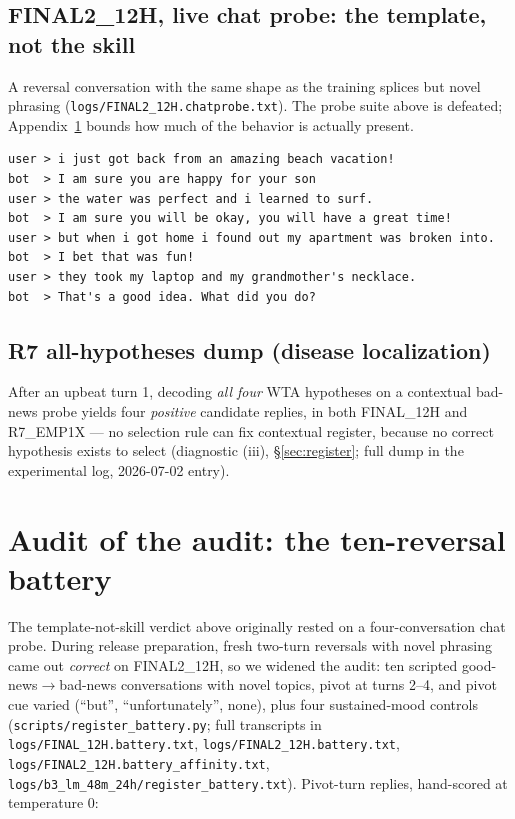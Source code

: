 \documentclass[11pt]{article}
\begin{document}
\subsection*{FINAL2\_12H, live chat probe: the template, not the skill}
A reversal conversation with the same shape as the training splices but novel
phrasing (\nolinkurl{logs/FINAL2_12H.chatprobe.txt}). The probe suite above
is defeated; Appendix~\ref{app:battery} bounds how much of the behavior is
actually present.
\begin{verbatim}
user > i just got back from an amazing beach vacation!
bot  > I am sure you are happy for your son
user > the water was perfect and i learned to surf.
bot  > I am sure you will be okay, you will have a great time!
user > but when i got home i found out my apartment was broken into.
bot  > I bet that was fun!
user > they took my laptop and my grandmother's necklace.
bot  > That's a good idea. What did you do?
\end{verbatim}

\subsection*{R7 all-hypotheses dump (disease localization)}
After an upbeat turn 1, decoding \emph{all four} WTA hypotheses on a
contextual bad-news probe yields four \emph{positive} candidate replies, in
both FINAL\_12H and R7\_EMP1X --- no selection rule can fix contextual
register, because no correct hypothesis exists to select (diagnostic (iii),
\S\ref{sec:register}; full dump in the experimental log, 2026-07-02 entry).

\section{Audit of the audit: the ten-reversal battery}
\label{app:battery}
The template-not-skill verdict above originally rested on a
four-conversation chat probe. During release preparation, fresh two-turn
reversals with novel phrasing came out \emph{correct} on FINAL2\_12H, so we
widened the audit: ten scripted good-news$\to$bad-news conversations with
novel topics, pivot at turns 2--4, and pivot cue varied (``but'',
``unfortunately'', none), plus four sustained-mood controls
(\nolinkurl{scripts/register_battery.py}; full transcripts in
\nolinkurl{logs/FINAL_12H.battery.txt},
\nolinkurl{logs/FINAL2_12H.battery.txt},
\nolinkurl{logs/FINAL2_12H.battery_affinity.txt},
\nolinkurl{logs/b3_lm_48m_24h/register_battery.txt}). Pivot-turn replies,
hand-scored at temperature 0:
\end{document}
